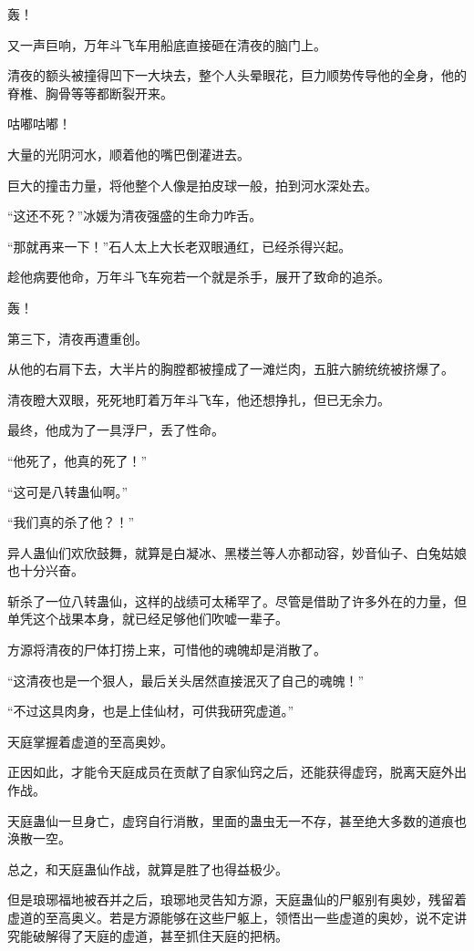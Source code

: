 \begin{this_body}
轰！

又一声巨响，万年斗飞车用船底直接砸在清夜的脑门上。

清夜的额头被撞得凹下一大块去，整个人头晕眼花，巨力顺势传导他的全身，他的脊椎、胸骨等等都断裂开来。

咕嘟咕嘟！

大量的光阴河水，顺着他的嘴巴倒灌进去。

巨大的撞击力量，将他整个人像是拍皮球一般，拍到河水深处去。

“这还不死？”冰媛为清夜强盛的生命力咋舌。

“那就再来一下！”石人太上大长老双眼通红，已经杀得兴起。

趁他病要他命，万年斗飞车宛若一个就是杀手，展开了致命的追杀。

轰！

第三下，清夜再遭重创。

从他的右肩下去，大半片的胸膛都被撞成了一滩烂肉，五脏六腑统统被挤爆了。

清夜瞪大双眼，死死地盯着万年斗飞车，他还想挣扎，但已无余力。

最终，他成为了一具浮尸，丢了性命。

“他死了，他真的死了！”

“这可是八转蛊仙啊。”

“我们真的杀了他？！”

异人蛊仙们欢欣鼓舞，就算是白凝冰、黑楼兰等人亦都动容，妙音仙子、白兔姑娘也十分兴奋。

斩杀了一位八转蛊仙，这样的战绩可太稀罕了。尽管是借助了许多外在的力量，但单凭这个战果本身，就已经足够他们吹嘘一辈子。

方源将清夜的尸体打捞上来，可惜他的魂魄却是消散了。

“这清夜也是一个狠人，最后关头居然直接泯灭了自己的魂魄！”

“不过这具肉身，也是上佳仙材，可供我研究虚道。”

天庭掌握着虚道的至高奥妙。

正因如此，才能令天庭成员在贡献了自家仙窍之后，还能获得虚窍，脱离天庭外出作战。

天庭蛊仙一旦身亡，虚窍自行消散，里面的蛊虫无一不存，甚至绝大多数的道痕也涣散一空。

总之，和天庭蛊仙作战，就算是胜了也得益极少。

但是琅琊福地被吞并之后，琅琊地灵告知方源，天庭蛊仙的尸躯别有奥妙，残留着虚道的至高奥义。若是方源能够在这些尸躯上，领悟出一些虚道的奥妙，说不定讲究能破解得了天庭的虚道，甚至抓住天庭的把柄。


\end{this_body}
